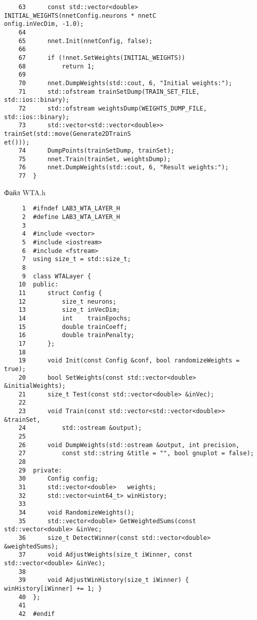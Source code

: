 \begin{verbatim}
    63	    const std::vector<double> INITIAL_WEIGHTS(nnetConfig.neurons * nnetC
onfig.inVecDim, -1.0);
    64	
    65	    nnet.Init(nnetConfig, false);
    66	
    67	    if (!nnet.SetWeights(INITIAL_WEIGHTS))
    68	        return 1;
    69	
    70	    nnet.DumpWeights(std::cout, 6, "Initial weights:");
    71	    std::ofstream trainSetDump(TRAIN_SET_FILE, std::ios::binary);
    72	    std::ofstream weightsDump(WEIGHTS_DUMP_FILE, std::ios::binary);
    73	    std::vector<std::vector<double>> trainSet(std::move(Generate2DTrainS
et()));
    74	    DumpPoints(trainSetDump, trainSet);
    75	    nnet.Train(trainSet, weightsDump);
    76	    nnet.DumpWeights(std::cout, 6, "Result weights:");
    77	}
\end{verbatim}

Файл WTA.h
\begin{verbatim}
     1	#ifndef LAB3_WTA_LAYER_H
     2	#define LAB3_WTA_LAYER_H
     3	
     4	#include <vector>
     5	#include <iostream>
     6	#include <fstream>
     7	using size_t = std::size_t;
     8	
     9	class WTALayer {
    10	public:
    11	    struct Config {
    12	        size_t neurons;
    13	        size_t inVecDim;
    14	        int    trainEpochs;
    15	        double trainCoeff;
    16	        double trainPenalty;
    17	    };
    18	
    19	    void Init(const Config &conf, bool randomizeWeights = true);
    20	    bool SetWeights(const std::vector<double> &initialWeights);
    21	    size_t Test(const std::vector<double> &inVec);
    22	
    23	    void Train(const std::vector<std::vector<double>> &trainSet,
    24	        std::ostream &output);
    25	
    26	    void DumpWeights(std::ostream &output, int precision,
    27	        const std::string &title = "", bool gnuplot = false);
    28	
    29	private:
    30	    Config config;
    31	    std::vector<double>   weights;
    32	    std::vector<uint64_t> winHistory;
    33	
    34	    void RandomizeWeights();
    35	    std::vector<double> GetWeightedSums(const std::vector<double> &inVec;
    36	    size_t DetectWinner(const std::vector<double> &weightedSums);
    37	    void AdjustWeights(size_t iWinner, const std::vector<double> &inVec);
    38	
    39	    void AdjustWinHistory(size_t iWinner) { winHistory[iWinner] += 1; }
    40	};
    41	
    42	#endif
\end{verbatim}

